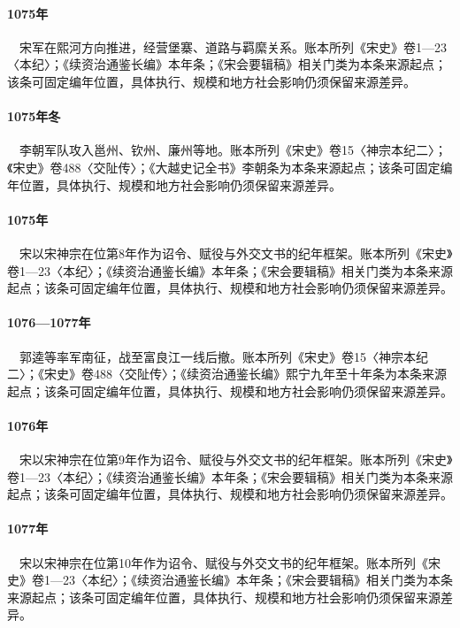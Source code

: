 \paragraph{1075年}　宋军在熙河方向推进，经营堡寨、道路与羁縻关系。账本所列《宋史》卷1—23〈本纪〉；《续资治通鉴长编》本年条；《宋会要辑稿》相关门类为本条来源起点；该条可固定编年位置，具体执行、规模和地方社会影响仍须保留来源差异。

\paragraph{1075年冬}　李朝军队攻入邕州、钦州、廉州等地。账本所列《宋史》卷15〈神宗本纪二〉；《宋史》卷488〈交阯传〉；《大越史记全书》李朝条为本条来源起点；该条可固定编年位置，具体执行、规模和地方社会影响仍须保留来源差异。

\paragraph{1075年}　宋以宋神宗在位第8年作为诏令、赋役与外交文书的纪年框架。账本所列《宋史》卷1—23〈本纪〉；《续资治通鉴长编》本年条；《宋会要辑稿》相关门类为本条来源起点；该条可固定编年位置，具体执行、规模和地方社会影响仍须保留来源差异。

\paragraph{1076—1077年}　郭逵等率军南征，战至富良江一线后撤。账本所列《宋史》卷15〈神宗本纪二〉；《宋史》卷488〈交阯传〉；《续资治通鉴长编》熙宁九年至十年条为本条来源起点；该条可固定编年位置，具体执行、规模和地方社会影响仍须保留来源差异。

\paragraph{1076年}　宋以宋神宗在位第9年作为诏令、赋役与外交文书的纪年框架。账本所列《宋史》卷1—23〈本纪〉；《续资治通鉴长编》本年条；《宋会要辑稿》相关门类为本条来源起点；该条可固定编年位置，具体执行、规模和地方社会影响仍须保留来源差异。

\paragraph{1077年}　宋以宋神宗在位第10年作为诏令、赋役与外交文书的纪年框架。账本所列《宋史》卷1—23〈本纪〉；《续资治通鉴长编》本年条；《宋会要辑稿》相关门类为本条来源起点；该条可固定编年位置，具体执行、规模和地方社会影响仍须保留来源差异。

